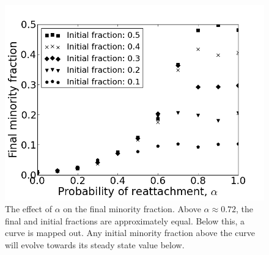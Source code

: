 \documentclass[11pt]{article}
\begin{document}
\begin{figure}[h!]
  \centering
  \includegraphics[width=.5\linewidth]{vmBifDiag5000}
  \caption{The effect of $\alpha$ on the final minority fraction. Above $\alpha \approx 0.72$, the final and initial fractions are approximately equal. Below this, a curve is mapped out. Any initial minority fraction above the curve will evolve towards its steady state value below.}
  \label{fig:vmBifDiag5000}
\end{figure}
\end{document}
